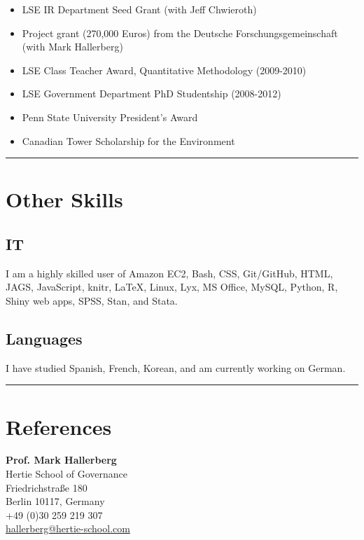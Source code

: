 \documentclass[a4paper]{article}
\begin{document}
{\begin{itemize}

    \item LSE IR Department Seed Grant (with Jeff Chwieroth)
    \item Project grant (270,000 Euros) from the Deutsche Forschungsgemeinschaft (with Mark Hallerberg)
    \item LSE Class Teacher Award, Quantitative Methodology (2009-2010)
    \item LSE Government Department PhD Studentship (2008-2012)
    \item Penn State University President's Award
    \item Canadian Tower Scholarship for the Environment

\end{itemize}

\vspace{0.5cm}
\medskip\hrule height 1pt
\vspace{0.5cm}

\section*{Other Skills}

\subsection*{IT}

I am a highly skilled user of Amazon EC2, Bash, CSS, Git/GitHub, HTML, JAGS, JavaScript, knitr, LaTeX, Linux, Lyx, MS Office, MySQL, Python, R, Shiny web apps, SPSS, Stan, and Stata.

\subsection*{Languages}

I have studied Spanish, French, Korean, and am currently working on German.


\vspace{0.5cm}
\medskip\hrule height 1pt
\vspace{0.5cm}

\section*{References}

\noindent \textbf{Prof. Mark Hallerberg} \\
Hertie School of Governance\\
Friedrichstra{\ss}e 180\\
Berlin 10117, Germany \\
+49 (0)30 259 219 307 \\
\href{mailto:hallerberg@hertie-school.com}{hallerberg@hertie-school.com}\\

}
\end{document}
